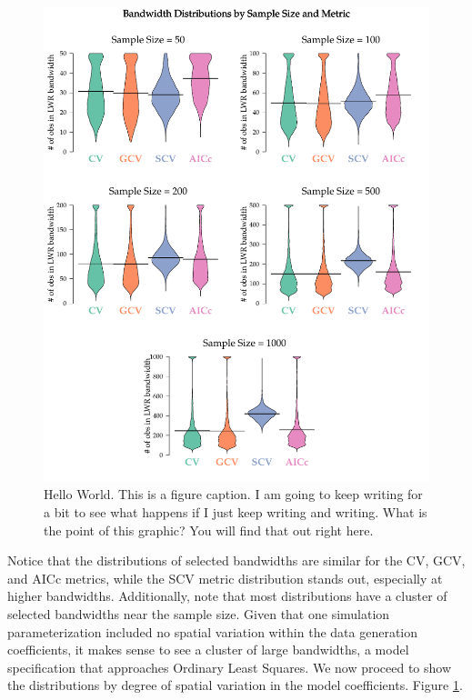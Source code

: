 \documentclass{article}
\newenvironment{knitrout}{}{} %
\begin{document}
\begin{knitrout}
\begin{figure}[]
\includegraphics{figure/beanplots} \caption[Hello World]{Hello World. This is a figure caption. I am going to keep writing for a bit to see what happens if I just keep writing and writing. What is the point of this graphic? You will find that out right here.\label{fig:beanplots}}
\end{figure}

\end{knitrout}


Notice that the distributions of selected bandwidths are similar for the CV, GCV, and AICc metrics, while the SCV metric distribution stands out, especially at higher bandwidths. Additionally, note that most distributions have a cluster of selected bandwidths near the sample size. Given that one simulation parameterization included no spatial variation within the data generation coefficients, it makes sense to see a cluster of large bandwidths, a model specification that approaches Ordinary Least Squares. We now proceed to show the distributions by degree of spatial variation in the model coefficients. Figure \ref{fig:beanplots}.
\end{document}
